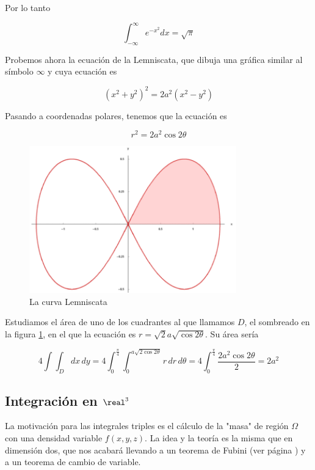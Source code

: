 \documentclass[nochap]{apuntes}
\begin{document}
Por lo tanto

\[ \int_{-\infty}^{\infty} e^{-x^2}dx = \sqrt{\pi} \]

Probemos ahora la ecuación de la  Lemniscata, que dibuja una gráfica similar al símbolo $\infty$ y cuya ecuación es

\[ (x^2+y^2)^2 = 2a^2(x^2-y^2) \]

Pasando a coordenadas polares, tenemos que la ecuación es

\[ r^2 = 2a^2\cos 2\theta \]

\begin{figure}[hbtp]    
	\begin{center} 
		\includegraphics[width=0.8\textwidth]{img/Lemniscata.png}  
		\caption{La curva Lemniscata} 
		\label{figLemniscata}
	\end{center}  
\end{figure}


Estudiamos el área de uno de los cuadrantes al que llamamos $D$, el sombreado en la figura \ref{figLemniscata}, en el que la ecuación es $r = \sqrt{2} a \sqrt{\cos 2\theta}$. Su área sería

\[ 4\int\int_D dx\,dy = 4\int_0^{\frac{\pi}{4}} \int_0^{a\sqrt{2\cos 2\theta}} r \,dr\,d\theta = 4\int_0^{\frac{\pi}{4}} \frac{2a^2\cos 2\theta}{2} = 2a^2 \]

\subsection{Integración en $\real^3$}

La motivación para las integrales triples es el cálculo de la "masa" de región $\Omega$ con una densidad variable $f(x,y,z)$. La idea y la teoría es la misma que en dimensión dos, que nos acabará llevando a un teorema de Fubini (ver página \pageref{lblFubini}) y a un teorema de cambio de variable.
\end{document}

